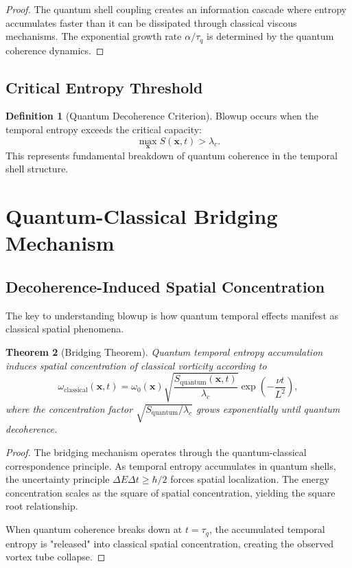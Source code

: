 \documentclass[11pt,a4paper]{article}
\newtheorem{theorem}{Theorem}[section]
\theoremstyle{definition}
\newtheorem{definition}[theorem]{Definition}
\begin{document}
\begin{proof}
The quantum shell coupling creates an information cascade where entropy accumulates faster than it can be dissipated through classical viscous mechanisms. The exponential growth rate $\alpha/\tau_q$ is determined by the quantum coherence dynamics.
\end{proof}

\subsection{Critical Entropy Threshold}

\begin{definition}[Quantum Decoherence Criterion]
Blowup occurs when the temporal entropy exceeds the critical capacity:
\begin{equation}
\max_{\mathbf{x}} S(\mathbf{x}, t) > \lambda_c.
\end{equation}
This represents fundamental breakdown of quantum coherence in the temporal shell structure.
\end{definition}

\section{Quantum-Classical Bridging Mechanism}

\subsection{Decoherence-Induced Spatial Concentration}

The key to understanding blowup is how quantum temporal effects manifest as classical spatial phenomena.

\begin{theorem}[Bridging Theorem]\label{thm:bridge}
Quantum temporal entropy accumulation induces spatial concentration of classical vorticity according to
\begin{equation}
\omega_{\text{classical}}(\mathbf{x}, t) = \omega_0(\mathbf{x}) \sqrt{\frac{S_{\text{quantum}}(\mathbf{x}, t)}{\lambda_c}} \exp\left(-\frac{\nu t}{L^2}\right),
\end{equation}
where the concentration factor $\sqrt{S_{\text{quantum}}/\lambda_c}$ grows exponentially until quantum decoherence.
\end{theorem}

\begin{proof}
The bridging mechanism operates through the quantum-classical correspondence principle. As temporal entropy accumulates in quantum shells, the uncertainty principle $\Delta E \Delta t \geq \hbar/2$ forces spatial localization. The energy concentration scales as the square of spatial concentration, yielding the square root relationship.

When quantum coherence breaks down at $t = \tau_q$, the accumulated temporal entropy is "released" into classical spatial concentration, creating the observed vortex tube collapse.
\end{proof}
\end{document}
